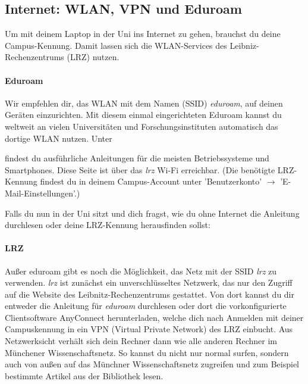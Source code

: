 \subsection{Internet: WLAN, VPN und Eduroam}

Um mit deinem Laptop in der Uni ins Internet zu gehen, brauchst du
deine Campus-Kennung. Damit lassen sich die WLAN-Services des
Leibniz-Rechen\-zentrums (LRZ) nutzen.

\paragraph{Eduroam}
Wir empfehlen dir, das WLAN mit dem Namen (SSID) \emph{eduroam}, auf deinen Geräten einzurichten. Mit diesem einmal eingerichteten Eduroam kannst du weltweit an vielen Universitäten und Forschungsinstituten automatisch das dortige WLAN nutzen. Unter \begin{urlList}
\end{urlList} findest du ausführliche Anleitungen für die meisten Betriebssysteme und Smartphones.
Diese Seite ist über das \emph{lrz} Wi-Fi erreichbar.
(Die benötigte LRZ-Kennung findest du in deinem Campus-Account unter 'Benutzerkonto' $\rightarrow$ 'E-Mail-Einstellungen'.)


Falls du nun in der Uni sitzt und dich fragst, wie du ohne Internet
die Anleitung durchlesen oder deine LRZ-Kennung herausfinden sollst:

\paragraph{LRZ}

Außer eduroam gibt es noch die Möglichkeit, das Netz mit der SSID
\emph{lrz} zu verwenden. \emph{lrz} ist zunächst ein unverschlüsseltes
Netzwerk, das nur den Zugriff auf die Website des
Leibnitz-Rechenzentrums gestattet. Von dort kannst du dir entweder die 
Anleitung für \emph{eduroam} durchlesen oder dort die
vorkonfigurierte Clientsoftware AnyConnect herunterladen, welche dich
nach Anmelden mit deiner Campuskennung in ein VPN (Virtual Private
Network) des LRZ einbucht. Aus Netzwerksicht verhält sich dein Rechner
dann wie alle anderen Rechner im Münchener Wissenschaftsnetz. So
kannst du nicht nur normal surfen, sondern auch von außen auf das
Münchner Wissenschaftsnetz zugreifen und zum Beispiel bestimmte
Artikel aus der Bibliothek lesen.

